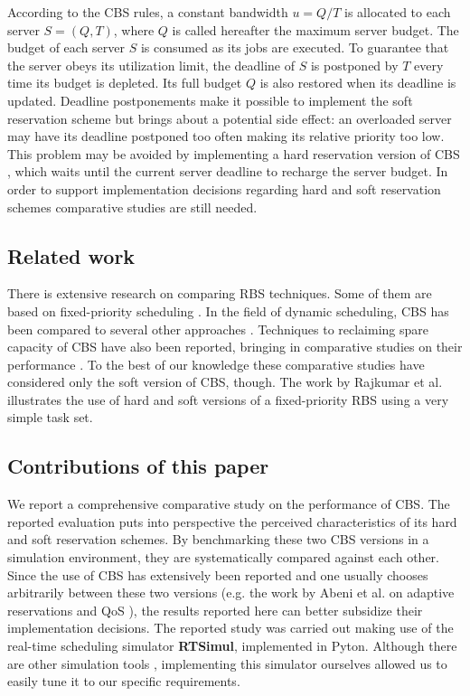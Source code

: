 \documentclass[12pt]{article}
\newcommand{\simul}{\textbf{RTSimul}} %
\begin{document}
According to the CBS rules, a constant bandwidth $u = Q/T$ is
allocated to each server $S = (Q,T)$, where $Q$ is called hereafter
the maximum server budget. The budget of each server $S$ is consumed
as its jobs are executed. To guarantee that the server obeys its
utilization limit, the deadline of $S$ is postponed by $T$ every time
its budget is depleted.  Its full budget $Q$ is also restored when its
deadline is updated.  Deadline postponements make it possible to
implement the soft reservation scheme but brings about a potential
side effect: an overloaded server may have its deadline postponed too
often making its relative priority too low.  This problem may be
avoided by implementing a hard reservation version of CBS
\cite{buttazzo05:soft}, which waits until the current server deadline
to recharge the server budget. In order to support implementation
decisions regarding hard and soft reservation schemes comparative
studies are still needed.

\subsection{Related work}
\label{sec:related-work}

There is extensive research on comparing RBS
techniques.  Some of them are based on fixed-priority scheduling
\cite{bernat.ea99:new,bernat.ea02:multiple,davis.ea05:hierarchical,davis.ea95:dual}.
In the field of dynamic scheduling, CBS has been compared to several
other approaches \cite{spuri.ea96:scheduling}.  Techniques to
reclaiming spare capacity of CBS have also been reported, bringing in
comparative studies on their performance
\cite{caccamo.ea00:capacity,lin.ea05:improving}. To the best of our
knowledge these comparative studies have considered only the soft
version of CBS, though.  The work by Rajkumar et
al. \cite{rajkumar.ea98:resource} illustrates the use of hard and soft
versions of a fixed-priority RBS using a very simple task set.

\subsection{Contributions of this paper}
\label{sec:contr-this-paper}

We report a comprehensive comparative study on the performance of
CBS. The reported evaluation puts into perspective the perceived
characteristics of its hard and soft reservation schemes.  By
benchmarking these two CBS versions in a simulation environment, they
are systematically compared against each other.  Since the use of CBS
has extensively been reported and one usually chooses arbitrarily
between these two versions (e.g. the work by Abeni et al. on adaptive
reservations and QoS \cite{abeni.ea99:adaptive,abeni.ea05:qos}), the
results reported here can better subsidize their implementation
decisions.  The reported study was carried out making use of the
real-time scheduling simulator \simul{}, implemented in
Pyton. Although there are other simulation tools
\cite{ancilotti.ea96:flexible}, implementing this simulator ourselves
allowed us to easily tune it to our specific requirements.
\end{document}
